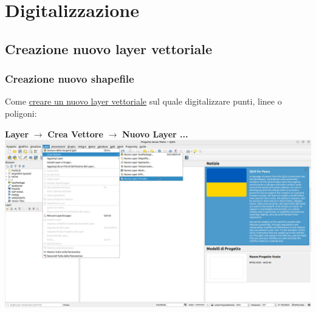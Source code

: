 \documentclass{beamer}
\begin{document}
{\section{Digitalizzazione}

\subsection{Creazione nuovo layer vettoriale}

\begin{frame}
    \frametitle{Creazione nuovo shapefile}
    Come \href{https://docs.qgis.org/3.22/en/docs/user_manual/managing_data_source/create_layers.html}{creare un nuovo layer vettoriale} sul quale digitalizzare punti, linee o poligoni:
    \begin{center}
        \textbf{Layer} $\rightarrow$ \textbf{Crea Vettore} $\rightarrow$ \textbf{Nuovo Layer ...}
    	\includegraphics[width=.97\textwidth]{digitizing_pics/Nuovo vettore del 2022-10-11 09-28-13.png}
    \end{center}
\end{frame} 


}
\end{document}
